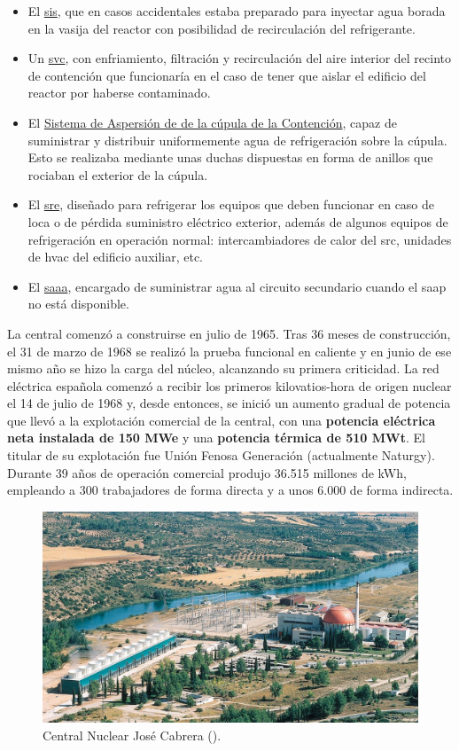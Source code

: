 \begin{itemize}
  \item El \underline{\acrlong{sis}}, que en casos accidentales estaba preparado para inyectar agua borada en la vasija del reactor con posibilidad de recirculación del refrigerante.
  \item Un \underline{\acrlong{svc}}, con enfriamiento, filtración y recirculación del aire interior del recinto de contención que funcionaría en el caso de tener que aislar el edificio del reactor por haberse contaminado.
  \item El \underline{Sistema de Aspersión de de la cúpula de la Contención}, capaz de suministrar y distribuir uniformemente agua de refrigeración sobre la cúpula. Esto se realizaba mediante unas duchas dispuestas en forma de anillos que rociaban el exterior de la cúpula.
  \item El \underline{\acrlong{sre}}, diseñado para refrigerar los equipos que deben funcionar en caso de \acrshort{loca} o de pérdida suministro eléctrico exterior, además de algunos equipos de refrigeración en operación normal: intercambiadores de calor del \acrlong{src}, unidades de \acrshort{hvac} del edificio auxiliar, etc.
  \item El \underline{\acrlong{saaa}}, encargado de suministrar agua al circuito secundario cuando el \acrlong{saap} no está disponible.
\end{itemize}

La central comenzó a construirse en julio de 1965. Tras 36 meses de construcción, el 31 de marzo de 1968 se realizó la prueba funcional en caliente y en junio de ese mismo año se hizo la carga del núcleo, alcanzando su primera criticidad. La red eléctrica española comenzó a recibir los primeros kilovatios-hora de origen nuclear el 14 de julio de 1968 y, desde entonces, se inició un aumento gradual de potencia que llevó a la explotación comercial de la central, con una \textbf{potencia eléctrica neta instalada de 150 MWe} y una \textbf{potencia térmica de 510 MWt}. El titular de su explotación fue Unión Fenosa Generación (actualmente Naturgy). Durante 39 años de operación comercial produjo 36.515 millones de kWh, empleando a 300 trabajadores de forma directa y a unos 6.000 de forma indirecta.

\begin{figure}[h]
    \centering
    \includegraphics[width=\textwidth]{content/figures/zorita.jpg}
    \caption{Central Nuclear José Cabrera (\cite{sne_recursos_prensa}).}
    \label{fig:zorita}
\end{figure}

